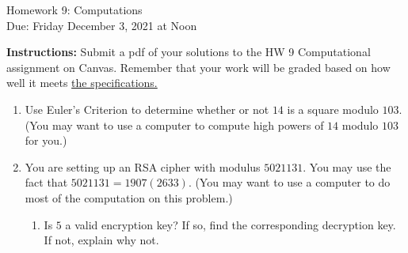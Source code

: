 \documentclass[10pt,a4paper]{article}
\begin{document}
\begin{center}
{\Large Homework 9: Computations}\\
Due: Friday December 3, 2021 at Noon\\


\end{center}
{\bf Instructions:} Submit a pdf of your solutions to the HW 9 Computational assignment on Canvas. Remember that your work will be graded based on how well it meets \href{https://docs.google.com/document/d/1emM06_WRh_h941rsjtRE9fRVndJtfRKd9gyS3Fs_rFA/edit?usp=sharing}{the specifications. }


\begin{enumerate}

\item Use Euler’s Criterion to determine whether or not $14$ is a square modulo $103$. (You
may want to use a computer to compute high powers of $14$ modulo $103$ for
you.) 
\item You are setting up an RSA cipher with modulus $5021131$.  You may use the fact that $5021131 = 1907(2633)$.  (You may want to use a computer to do most of the computation on this problem.)
\begin{enumerate}
\item Is $5$ a valid encryption key?  If so, find the corresponding decryption key.  If not, explain why not.


\end{enumerate}
\end{enumerate}
\end{document}

